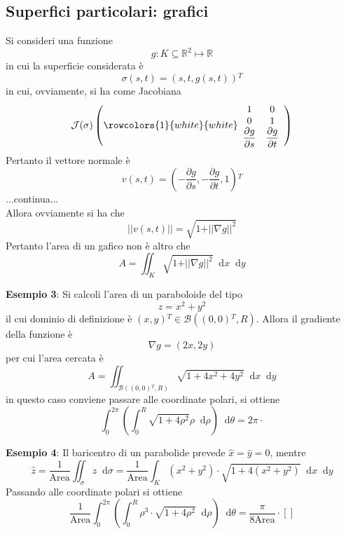 \documentclass[a4paper]{extarticle}
\newcommand*\dif{\mathop{}\!\mathrm{d}}
\begin{document}
\subsection{Superfici particolari: grafici}
Si consideri una funzione
\[g : K \subseteq \mathbb{R}^2 \longmapsto \mathbb{R}\]
in cui la superficie considerata è
\[\sigma(s,t)=\left(s,t,g(s,t)\right){^T}\]
in cui, ovviamente, si ha come Jacobiana
\[
    \mathcal{J}(\sigma)
    \left(
        \rowcolors{1}{white}{white}
        \begin{array}{cc}
            1 & 0\\
            0 & 1\\
            \dfrac{\partial g}{\partial s} & \dfrac{\partial g}{\partial t}\\
        \end{array}
    \right)
\]
Pertanto il vettore normale è
\[v(s,t)=\left(-\frac{\partial g}{\partial s},-\frac{\partial g}{\partial t}, 1\right){^T}\]
...continua...\\
Allora ovviamente si ha che
\[\vert\vert v(s,t) \vert \vert = \sqrt{1+\vert\vert \nabla g \vert\vert^2}\]
Pertanto l'area di un gafico non è altro che
\[A = \iint_K \sqrt{1+\vert\vert\nabla g\vert\vert^2} \dif x \dif y\]

\vspace{2em}
\noindent
\textbf{Esempio 3}: Si calcoli l'area di un paraboloide del tipo
\[z=x^2+y^2\]
il cui dominio di definizione è $(x,y){^T} \in \mathcal{B}((0,0){^T},R)$. Allora il gradiente della funzione è
\[\nabla g = (2x,2y)\]
per cui l'area cercata è
\[A=\iint_{\mathcal{B}((0,0){^T},R)} \sqrt{1+4x^2+4y^2} \dif x \dif y\]
in questo caso conviene passare alle coordinate polari, si ottiene
\[\int_0^{2\pi} \left(\int_0^R \sqrt{1+4 \rho^2} \rho \dif \rho \right) \dif \theta = 2\pi \cdot \]

\vspace{2em}
\noindent
\textbf{Esempio 4}: Il baricentro di un parabolide prevede $\hat x = \hat y = 0$, mentre
\[\hat z = \frac{1}{\text{Area}} \iint_\sigma z \dif \sigma = \frac{1}{\text{Area}} \int_K (x^2+y^2) \cdot \sqrt{1+4(x^2+y^2)} \dif x \dif y\]
Passando alle coordinate polari si ottiene
\[\frac{1}{\text{Area}}\int_0^{2\pi} \left(\int_0^R \rho^3 \cdot \sqrt{1+4 \rho^2} \dif \rho \right) \dif \theta = \frac{\pi}{8\text{Area}} \cdot \left[\right]\]

\vspace{1em}
\end{document}

